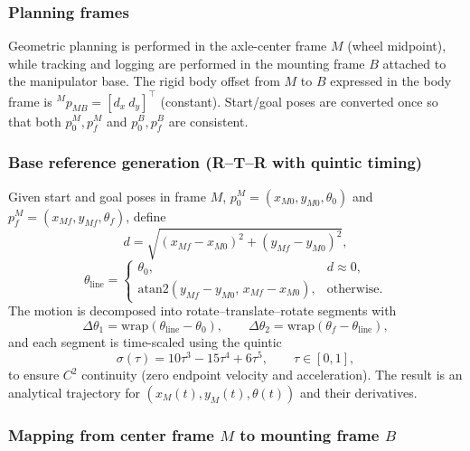 \documentclass[conference]{IEEEtran}
\begin{document}
\subsubsection{Planning frames}

Geometric planning is performed in the axle-center frame $M$ (wheel midpoint),
while tracking and logging are performed in the mounting frame $B$ attached to
the manipulator base. The rigid body offset from $M$ to $B$ expressed in the
body frame is ${}^{M}\!p_{MB}=[d_x~d_y]^\top$ (constant). Start/goal poses are
converted once so that both $p_0^M,p_f^M$ and $p_0^B,p_f^B$ are consistent.

\subsubsection{Base reference generation (R--T--R with quintic timing)}

Given start and goal poses in frame $M$,
$p_0^M=(x_{M0},y_{M0},\theta_0)$ and $p_f^M=(x_{Mf},y_{Mf},\theta_f)$, define
\begin{equation}
d = \sqrt{(x_{Mf}-x_{M0})^2 + (y_{Mf}-y_{M0})^2},
\end{equation}
\begin{equation}
\theta_{\mathrm{line}} =
\begin{cases}
\theta_0, & d \approx 0,\\
\mathrm{atan2}(y_{Mf}-y_{M0},\,x_{Mf}-x_{M0}), & \text{otherwise}.
\end{cases}
\end{equation}
The motion is decomposed into rotate--translate--rotate segments with
\begin{equation}
\Delta\theta_1 = \mathrm{wrap}(\theta_{\mathrm{line}}-\theta_0),\qquad
\Delta\theta_2 = \mathrm{wrap}(\theta_f-\theta_{\mathrm{line}}),
\end{equation}
and each segment is time-scaled using the quintic
\begin{equation}
\sigma(\tau)=10\tau^3-15\tau^4+6\tau^5,\qquad \tau\in[0,1],
\end{equation}
to ensure $C^2$ continuity (zero endpoint velocity and acceleration). The
result is an analytical trajectory for $(x_M(t),y_M(t),\theta(t))$ and their
derivatives.

\subsubsection{Mapping from center frame $M$ to mounting frame $B$}
\end{document}
